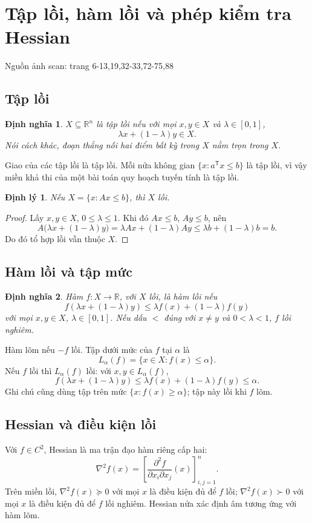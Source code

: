 \documentclass[11pt,a4paper]{article}
\newcommand{\R}{\mathbb{R}}
\newcommand{\Hess}{\nabla^2}
\newcommand{\T}{^{\mathsf T}}
\newcommand{\src}[1]{\hfill{\footnotesize\color{gray}Nguồn ảnh scan: trang #1}}
\newtheorem{theorem}{Định lý}
\newtheorem{definition}{Định nghĩa}
\begin{document}
\section{Tập lồi, hàm lồi và phép kiểm tra Hessian}
\src{6-13,19,32-33,72-75,88}

\subsection{Tập lồi}
\begin{definition}
\(X\subseteq\R^n\) là tập lồi nếu với mọi \(x,y\in X\) và \(\lambda\in[0,1]\),
\[
\lambda x+(1-\lambda)y\in X.
\]
Nói cách khác, đoạn thẳng nối hai điểm bất kỳ trong \(X\) nằm trọn trong \(X\).
\end{definition}
Giao của các tập lồi là tập lồi. Mỗi nửa không gian \(\{x:a\T x\le b\}\) là tập lồi, vì vậy miền khả thi của một bài toán quy hoạch tuyến tính là tập lồi.

\begin{theorem}
Nếu \(X=\{x:Ax\le b\}\), thì \(X\) lồi.
\end{theorem}
\begin{proof}
Lấy \(x,y\in X\), \(0\le\lambda\le1\). Khi đó \(Ax\le b\), \(Ay\le b\), nên
\[
A\bigl(\lambda x+(1-\lambda)y\bigr)
=\lambda Ax+(1-\lambda)Ay
\le\lambda b+(1-\lambda)b=b.
\]
Do đó tổ hợp lồi vẫn thuộc \(X\).
\end{proof}

\subsection{Hàm lồi và tập mức}
\begin{definition}
Hàm \(f:X\to\R\), với \(X\) lồi, là hàm lồi nếu
\[
f(\lambda x+(1-\lambda)y)
\le\lambda f(x)+(1-\lambda)f(y)
\]
với mọi \(x,y\in X\), \(\lambda\in[0,1]\). Nếu dấu \(<\) đúng với \(x\ne y\) và \(0<\lambda<1\), \(f\) lồi nghiêm.
\end{definition}
Hàm lõm nếu \(-f\) lồi. Tập dưới mức của \(f\) tại \(\alpha\) là
\[
L_\alpha(f)=\{x\in X:f(x)\le\alpha\}.
\]
Nếu \(f\) lồi thì \(L_\alpha(f)\) lồi: với \(x,y\in L_\alpha(f)\),
\[
f(\lambda x+(1-\lambda)y)
\le\lambda f(x)+(1-\lambda)f(y)\le\alpha.
\]
Ghi chú cũng dùng tập trên mức \(\{x:f(x)\ge\alpha\}\); tập này lồi khi \(f\) lõm.

\subsection{Hessian và điều kiện lồi}
Với \(f\in C^2\), Hessian là ma trận đạo hàm riêng cấp hai:
\[
\Hess f(x)=
\left[\frac{\partial^2 f}{\partial x_i\partial x_j}(x)\right]_{i,j=1}^n.
\]
Trên miền lồi, \(\Hess f(x)\succeq0\) với mọi \(x\) là điều kiện đủ để \(f\) lồi; \(\Hess f(x)\succ0\) với mọi \(x\) là điều kiện đủ để \(f\) lồi nghiêm. Hessian nửa xác định âm tương ứng với hàm lõm.
\end{document}
